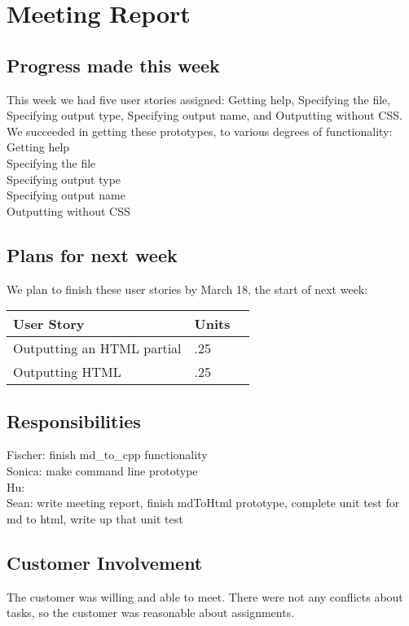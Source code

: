 \section{Meeting Report}

\subsection{Progress made this week}
This week we had five user stories assigned: Getting help, Specifying the file, Specifying output type, Specifying output name, and Outputting without CSS.\\
We succeeded in getting these prototypes, to various degrees of functionality: \\
Getting help\\
Specifying the file\\
Specifying output type\\
Specifying output name\\
Outputting without CSS\\



\subsection{Plans for next week}
We plan to finish these user stories by March 18, the start of next week:

 \begin{center}
    \begin{tabular}{ | l | l | p{5cm} |}
    \hline
    User Story & Units \\ \hline
    Outputting an HTML partial & .25 \\ \hline
    Outputting HTML & .25 \\ \hline
    \end{tabular}
\end{center}


\subsection{Responsibilities}
Fischer: finish md\_to\_cpp functionality  \\
Sonica: make command line prototype\\
Hu: \\
Sean: write meeting report, finish mdToHtml prototype, complete unit test for md to html, write up that unit test\\

\subsection{Customer Involvement}
The customer was willing and able to meet.
There were not any conflicts about tasks, so the customer was reasonable about assignments.

